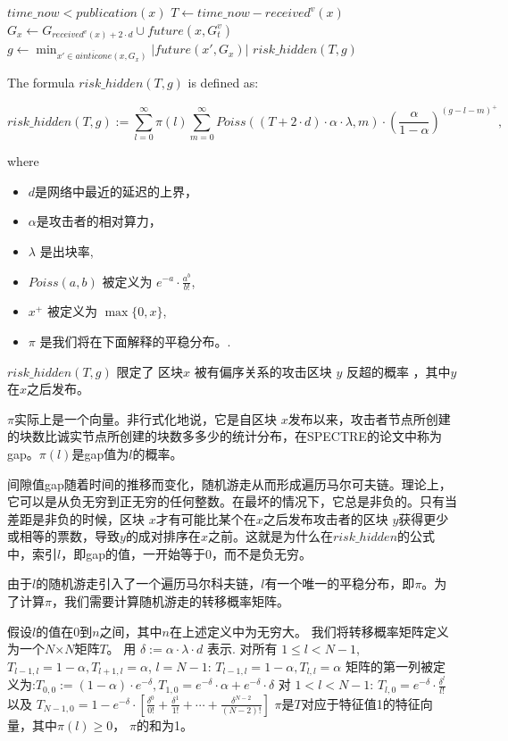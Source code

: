 \documentclass[a4paper,11pt]{article}
\begin{document}
\begin{codebox}
\li \If $time\_now < publication(x)$
\li   \Then
      \End
\li $T \gets time\_now - received^v(x)$
\li $G_x \gets G_{received^v(x) + 2 \cdot d} \cup future(x, G_t^v)$
\li $g \gets \min_{x' \in \overline{ainticone}(x,G_x)} |future(x',G_x)|$
\li \Return $risk\_hidden(T,g)$
\end{codebox}

The formula $risk\_hidden(T,g)$ is defined as:

$$
risk\_hidden(T,g) := \sum_{l=0}^{\infty} \pi(l) \sum_{m=0}^{\infty} Poiss((T + 2
\cdot d) \cdot \alpha \cdot \lambda, m) \cdot \left(\frac{\alpha}{1 -
\alpha}\right)^{(g - l - m)^+},
$$

where

\begin{itemize}
	\item $d$是网络中最近的延迟的上界，
	\item $\alpha$是攻击者的相对算力，
	\item $\lambda$ 是出块率,
	\item $Poiss(a, b)$ 被定义为 $e^{-a} \cdot \frac{a^b}{b!}$,
	\item $x^+$ 被定义为 $\max\{0, x\}$,
	\item  $\pi$ 是我们将在下面解释的平稳分布。.
\end{itemize}

$risk\_hidden(T,g)$  限定了 区块$x$ 被有偏序关系的攻击区块 $y$ 反超的概率  ，其中$y$在$x$之后发布。


$\pi$实际上是一个向量。非行式化地说，它是自区块 $x$发布以来，攻击者节点所创建的块数比诚实节点所创建的块数多多少的统计分布，在SPECTRE的论文中称为gap。$\pi(l)$是gap值为$l$的概率。

间隙值gap随着时间的推移而变化，随机游走从而形成遍历马尔可夫链。理论上，它可以是从负无穷到正无穷的任何整数。在最坏的情况下，它总是非负的。只有当差距是非负的时候，区块 $x$才有可能比某个在$x$之后发布攻击者的区块 $y$获得更少或相等的票数，导致$y$的成对排序在$x$之前。这就是为什么在$risk\_hidden$的公式中，索引$l$，即gap的值，一开始等于0，而不是负无穷。

由于$l$的随机游走引入了一个遍历马尔科夫链，$l$有一个唯一的平稳分布，即$\pi$。为了计算$\pi$，我们需要计算随机游走的转移概率矩阵。

假设$l$的值在0到$n$之间，其中$n$在上述定义中为无穷大。
我们将转移概率矩阵定义为一个$N$×$N$矩阵$T$。
用  $\delta := \alpha \cdot \lambda \cdot d$ 表示.
对所有 $1 \leq l < N - 1$, $T_{l-1,l} = 1 - \alpha, T_{l+1,l} = \alpha$, $l = N
- 1$: $T_{l-1,l} = 1 - \alpha, T_{l,l} = \alpha$
矩阵的第一列被定义为:$T_{0,0} := (1 - \alpha) \cdot e^{-\delta}, T_{1,0} = e^{-\delta}
\cdot \alpha + e^{-\delta} \cdot \delta$
对 $1 < l < N - 1$: $T_{l,0} =e^{-\delta} \cdot \frac{\delta^l}{l!}$
以及 $T_{N-1,0} = 1 - e^{-\delta} \cdot \left[\frac{\delta^0}{0!} + \frac{\delta^1}{1!} + \cdots + \frac{\delta^{N-2}}{(N-2)!}\right]$
$\pi$是$T$对应于特征值1的特征向量，其中$\pi(l) \geq 0$， $\pi$的和为1。
\end{document}
